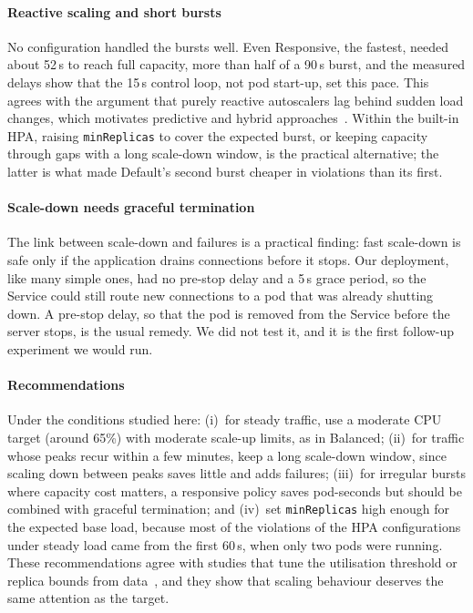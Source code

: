 \documentclass[conference,a4paper]{IEEEtran}
\begin{document}
\paragraph{Reactive scaling and short bursts}
No configuration handled the bursts well. Even Responsive, the fastest, needed
about 52\,s to reach full capacity, more than half of a 90\,s burst, and the
measured delays show that the 15\,s control loop, not pod start-up, set this
pace. This agrees with the argument that purely reactive autoscalers lag
behind sudden load changes, which motivates predictive and hybrid
approaches~\cite{bauer2019chameleon,calheiros2015workload,dangquang2021deep,imdoukh2020machine}.
Within the built-in HPA, raising \texttt{minReplicas} to cover the expected
burst, or keeping capacity through gaps with a long scale-down window, is the
practical alternative; the latter is what made Default's second burst cheaper in
violations than its first.

\paragraph{Scale-down needs graceful termination}
The link between scale-down and failures is a practical finding: fast
scale-down is safe only if the application drains connections before it stops.
Our deployment, like many simple ones, had no pre-stop delay and a 5\,s grace
period, so the Service could still route new connections to a pod that was
already shutting down. A pre-stop delay, so that the pod is removed from the
Service before the server stops, is the usual remedy. We did not test it,
and it is the first follow-up experiment we would run.

\paragraph{Recommendations}
Under the conditions studied here: (i)~for steady traffic, use a moderate CPU
target (around 65\%) with moderate scale-up limits, as in Balanced; (ii)~for
traffic whose peaks recur within a few minutes, keep a long scale-down window,
since scaling down between peaks saves little and adds failures; (iii)~for
irregular bursts where capacity cost matters, a responsive policy saves
pod-seconds but should be combined with graceful termination; and (iv)~set
\texttt{minReplicas} high enough for the expected base load, because most of
the violations of the HPA configurations under steady load came from the first
60\,s, when only two pods were running. These recommendations agree with studies that tune the
utilisation threshold or replica bounds from
data~\cite{pozdniakova2024slaadaptive,augustyn2024tuning}, and they show that
scaling behaviour deserves the same attention as the target.
\end{document}
